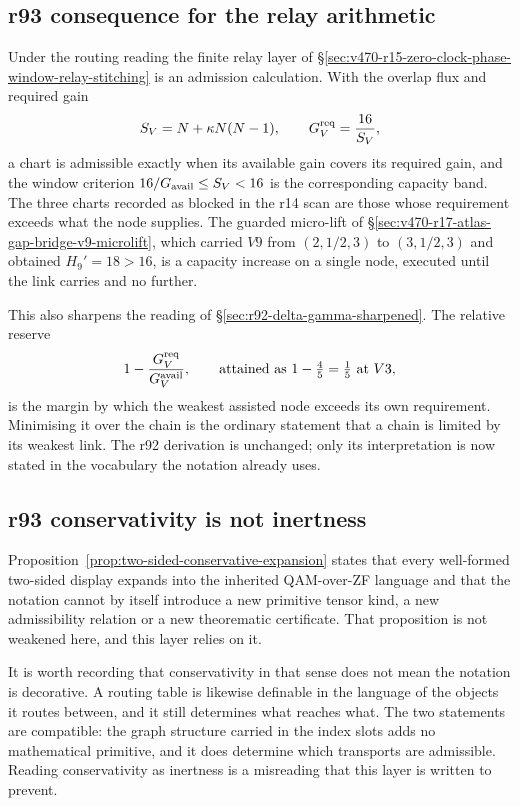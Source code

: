 \subsection*{r93 consequence for the relay arithmetic}
\label{subsec:r93-admission-reading}

Under the routing reading the finite relay layer of
\S\ref{sec:v470-r15-zero-clock-phase-window-relay-stitching} is an admission calculation.
With the overlap flux and required gain
\[
S_V=N+\kappa N(N-1),
\qquad
G_V^{\rm req}=\frac{16}{S_V},
\]
a chart is admissible exactly when its available gain covers its required gain, and the
window criterion \(16/G_{\rm avail}\le S_V<16\) is the corresponding capacity band.  The
three charts recorded as blocked in the r14 scan are those whose requirement exceeds what the
node supplies.  The guarded micro-lift of
\S\ref{sec:v470-r17-atlas-gap-bridge-v9-microlift}, which carried \(V9\) from \((2,1/2,3)\) to
\((3,1/2,3)\) and obtained \(H_9'=18>16\), is a capacity increase on a single node, executed
until the link carries and no further.

This also sharpens the reading of \S\ref{sec:r92-delta-gamma-sharpened}.  The relative reserve
\[
1-\frac{G_{V}^{\rm req}}{G_{V}^{\rm avail}},
\qquad
\text{attained as } 1-\tfrac45=\tfrac15 \text{ at } V3,
\]
is the margin by which the weakest assisted node exceeds its own requirement.  Minimising it
over the chain is the ordinary statement that a chain is limited by its weakest link.  The
r92 derivation is unchanged; only its interpretation is now stated in the vocabulary the
notation already uses.

\subsection*{r93 conservativity is not inertness}
\label{subsec:r93-conservativity}

Proposition~\ref{prop:two-sided-conservative-expansion} states that every well-formed
two-sided display expands into the inherited QAM-over-ZF language and that the notation cannot
by itself introduce a new primitive tensor kind, a new admissibility relation or a new
theorematic certificate.  That proposition is not weakened here, and this layer relies on it.

It is worth recording that conservativity in that sense does not mean the notation is
decorative.  A routing table is likewise definable in the language of the objects it routes
between, and it still determines what reaches what.  The two statements are compatible: the
graph structure carried in the index slots adds no mathematical primitive, and it does
determine which transports are admissible.  Reading conservativity as inertness is a misreading
that this layer is written to prevent.

